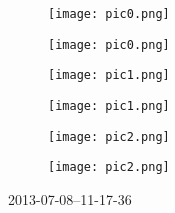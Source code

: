 \documentclass[10pt,a6paper,DIV=60]{scrartcl}
\begin{document}
\begin{figure}[h]
  \begin{minipage}[b]{0.48\linewidth}
    \texttt{[image: pic0.png]}
  \end{minipage}
  \hfill
  \begin{minipage}[b]{0.48\linewidth}
    \texttt{[image: pic0.png]}
  \end{minipage}
\end{figure}
\vspace{-1em}
\begin{figure}[h]
  \begin{minipage}[b]{0.48\linewidth}
    \texttt{[image: pic1.png]}
  \end{minipage}
  \hfill
  \begin{minipage}[b]{0.48\linewidth}
    \texttt{[image: pic1.png]}
  \end{minipage}
\end{figure}
\vspace{-1em}
\begin{figure}[h]
  \begin{minipage}[b]{0.48\linewidth}
    \texttt{[image: pic2.png]}
  \end{minipage}
  \hfill
  \begin{minipage}[b]{0.48\linewidth}
    \texttt{[image: pic2.png]}
  \end{minipage}
\end{figure}
\vfill
\tiny{2013-07-08--11-17-36}
\end{document}
